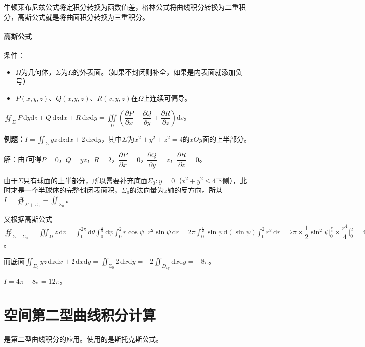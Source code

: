 牛顿莱布尼兹公式将定积分转换为函数值差，格林公式将曲线积分转换为二重积分，高斯公式就是将曲面积分转换为三重积分。

\paragraph{高斯公式} \leavevmode \medskip

条件：

\begin{itemize}
    \item $\Omega$为几何体，$\Sigma$为$\Omega$的外表面。（如果不封闭则补全，如果是内表面就添加负号）
    \item $P(x,y,z)$、$Q(x,y,z)$、$R(x,y,z)$在$\Omega$上连续可偏导。
\end{itemize}

$\displaystyle{\oiint_\Sigma P\,\textrm{d}y\textrm{d}z+Q\,\textrm{d}z\textrm{d}x+R\,\textrm{d}x\textrm{d}y=\iiint\limits_\Omega\left(\dfrac{\partial P}{\partial x}+\dfrac{\partial Q}{\partial y}+\dfrac{\partial R}{\partial z}\right)\textrm{d}v}$。

\textbf{例题：}$I=\iint_\Sigma yz\,\textrm{d}z\textrm{d}x+2\,\textrm{d}x\textrm{d}y$，其中$\Sigma$为$x^2+y^2+z^2=4$的$xOy$面的上半部分。

解：由$I$可得$P=0$，$Q=yz$，$R=2$，$\dfrac{\partial P}{\partial x}=0$，$\dfrac{\partial Q}{\partial y}=z$，$\dfrac{\partial R}{\partial z}=0$。

由于$\Sigma$只有球面的上半部分，所以需要补充底面$\Sigma_0:y=0$（$x^2+y^2\leqslant4$下侧），此时才是一个半球体的完整封闭表面积，$\Sigma_0$的法向量为$z$轴的反方向。所以$I=\oiint_{\Sigma+\Sigma_0}-\iint_{\Sigma_0}$。

又根据高斯公式$\oiint_{\Sigma+\Sigma_0}=\iiint_\Omega z\,\textrm{d}v=\int_0^{2\pi}\textrm{d}\theta\int_0^{\frac{\pi}{2}}\textrm{d}\psi\int_0^2r\cos\psi\cdot r^2\sin\psi\,\textrm{d}r=2\pi\int_0^{\frac{\pi}{2}}\sin\psi\,\textrm{d}(\sin\psi)\int_0^2r^3\,\textrm{d}r=2\pi\times\dfrac{1}{2}\sin^2\psi\vert_0^{\frac{\pi}{2}}\times\dfrac{r^4}{4}\vert_0^2=4\pi$。

而底面$\iint_{\Sigma_0}yz\,\textrm{d}z\textrm{d}x+2\,\textrm{d}x\textrm{d}y=\iint_{\Sigma_0}2\,\textrm{d}x\textrm{d}y=-2\iint_{D_{xy}}\textrm{d}x\textrm{d}y=-8\pi$。

$I=4\pi+8\pi=12\pi$。

\section{空间第二型曲线积分计算}

是第二型曲线积分的应用。使用的是斯托克斯公式。

%
